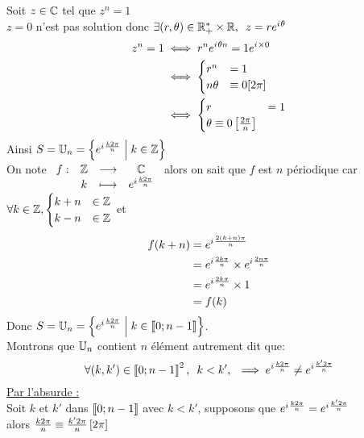 \begin{dem}
    Soit \(z \in\mathbb{C}\) tel que \(z^n = 1\) \\
    \(z=0\) n'est pas solution donc \(\quantifs{\exists (r,\theta) \in \Rps\times\R}z = re^{\i \theta}\) 
    \begin{align*}
        z^n=1 &\iff r^ne^{i\mkern1mu \theta n }= 1e^{i\mkern1mu \times 0} \\
        &\iff  
            \begin{cases}
                r^n &= 1 \\
                n \theta &\equiv 0 [2\pi]
            \end{cases}\\
        &\iff \begin{cases}
                r &= 1 \\
                \theta \equiv 0 \left[\frac{2\pi}{n}\right]
            \end{cases}\\
    \end{align*}
    Ainsi \(S = \mathbb{U}_n =\left\lbrace e^{i\mkern1mu \frac{k2\pi}{n}}\;\middle|\; k \in \mathbb{Z}\right\rbrace\) \\
    On note \(\begin{array}[t]{cccc}f : & \mathbb{Z} & \longrightarrow & \mathbb{C} \\ & k & \longmapsto & e^{i\mkern1mu \frac{k2\pi}{n}}\end{array}\) alors on sait que \(f\) est \(n\) périodique car \(\forall  k \in \mathbb{Z}, \begin{cases}
        k+n &\in \mathbb{Z} \\
        k-n &\in \mathbb{Z}
    \end{cases} \)
    et 
    \begin{align*}
        f(k+n) &= e^{i\mkern1mu \frac{2(k+n)\pi}{n}} \\
               &= e^{i\mkern1mu \frac{2k\pi}{n}}\times e^{i\mkern1mu \frac{2n\pi}{n}} \\
               &= e^{i\mkern1mu \frac{2k\pi}{n}}\times 1 \\
               &= f(k)
    \end{align*}
    Donc \(S = \mathbb{U}_n =\left\lbrace e^{i\mkern1mu \frac{k2\pi}{n}}\;\middle|\; k \in \left\llbracket0;n-1\right\rrbracket\right\rbrace\). \\
    Montrons que \(\mathbb{U}_n\) contient \(n\) élément autrement dit que: 
    \[\quantifs{\forall (k,k') \in\interventierii{0}{n-1}^2;k<k'} \imp e^{\i \frac{k2\pi}{n}} \neq e^{\i \frac{k'2\pi}{n}}\]
    \underline{Par l'absurde :}\\
    Soit \(k\) et \(k'\) dans \(\left\llbracket0;n-1\right\rrbracket\) avec \(k<k'\), supposons que \(e^{i\mkern1mu \frac{k2\pi}{n}} = e^{i\mkern1mu \frac{k'2\pi}{n}}\) \\
    alors \(\frac{k2\pi}{n} \equiv \frac{k'2\pi}{n} \left[2\pi\right]\)\\

\end{dem}
